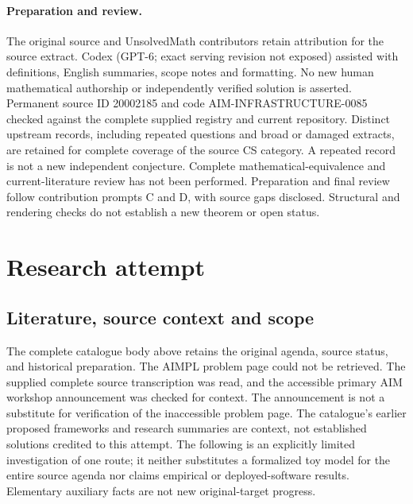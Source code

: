 \documentclass[11pt]{article}
\begin{document}
\paragraph{Preparation and review.}
The original source and UnsolvedMath contributors retain attribution for the source extract. Codex (GPT-6; exact serving revision not exposed) assisted with definitions, English summaries, scope notes and formatting. No new human mathematical authorship or independently verified solution is asserted. Permanent source ID 20002185 and code AIM-INFRASTRUCTURE-0085 checked against the complete supplied registry and current repository. Distinct upstream records, including repeated questions and broad or damaged extracts, are retained for complete coverage of the source CS category. A repeated record is not a new independent conjecture. Complete mathematical-equivalence and current-literature review has not been performed. Preparation and final review follow contribution prompts C and D, with source gaps disclosed. Structural and rendering checks do not establish a new theorem or open status.
\label{end:20002185}

\section{Research attempt}
\subsection{Literature, source context and scope}
The complete catalogue body above retains the original agenda, source status, and historical preparation. The AIMPL problem page could not be retrieved. The supplied complete source transcription was read, and the accessible primary AIM workshop announcement was checked for context. The announcement is not a substitute for verification of the inaccessible problem page. The catalogue's earlier proposed frameworks and research summaries are context, not established solutions credited to this attempt. The following is an explicitly limited investigation of one route; it neither substitutes a formalized toy model for the entire source agenda nor claims empirical or deployed-software results. Elementary auxiliary facts are not new original-target progress.
\end{document}
